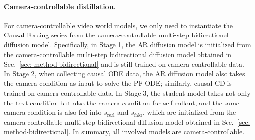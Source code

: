 \paragraph{Camera-controllable distillation.} For camera-controllable video world models, we only need to instantiate the Causal Forcing series from the camera-controllable multi-step bidirectional diffusion model. Specifically, in Stage 1, the AR diffusion model is initialized from the camera-controllable multi-step bidirectional diffusion model obtained in Sec.~\ref{sec: method-bidirectional} and is still trained on camera-controllable data. In Stage 2, when collecting causal ODE data, the AR diffusion model also takes the camera condition as input to solve the PF-ODE; similarly, causal CD is trained on camera-controllable data. In Stage 3, the student model takes not only the text condition but also the camera condition for self-rollout, and the same camera condition is also fed into $s_\text{real}$ and $s_\text{fake}$, which are initialized from the camera-controllable multi-step bidirectional diffusion model obtained in Sec.~\ref{sec: method-bidirectional}. In summary, all involved models are camera-controllable.